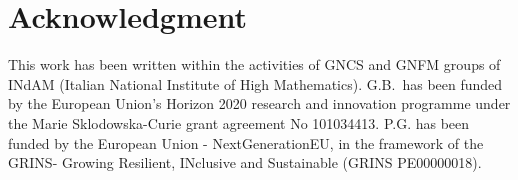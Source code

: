 \documentclass{article}
\begin{document}
\section*{Acknowledgment}

This work has been written within the activities of GNCS and GNFM groups of INdAM (Italian National Institute of High Mathematics). G.B.~has been funded by the European Union’s Horizon 2020 research and innovation programme under the Marie Sklodowska-Curie grant agreement No 101034413. P.G.  has been funded by the European Union - NextGenerationEU, in the framework of the GRINS- Growing Resilient, INclusive and Sustainable (GRINS PE00000018).



\end{document}
